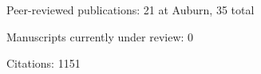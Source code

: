 \begin{veryTightItemize}
    \item Peer-reviewed publications: 21 at Auburn, 35 total
    \item Manuscripts currently under review: 0
    \item Citations: 1151
\end{veryTightItemize}
